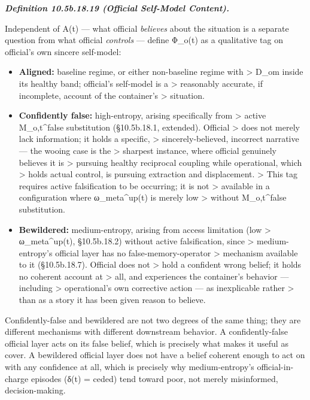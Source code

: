 \documentclass[
]{article}
\begin{document}
\emph{\textbf{Definition 10.5b.18.19 (Official Self-Model Content).}}

Independent of A(t) --- what official \emph{believes} about the
situation is a separate question from what official \emph{controls} ---
define Φ\_o(t) as a qualitative tag on official's own sincere
self-model:

\begin{itemize}
\item
  \textbf{Aligned:} baseline regime, or either non-baseline regime with
  \textgreater{} D\_om inside its healthy band; official's self-model is
  a \textgreater{} reasonably accurate, if incomplete, account of the
  container's \textgreater{} situation.
\item
  \textbf{Confidently false:} high-entropy, arising specifically from
  \textgreater{} active M\_o,t\^{}false substitution (§10.5b.18.1,
  extended). Official \textgreater{} does not merely lack information;
  it holds a specific, \textgreater{} sincerely-believed, incorrect
  narrative --- the wooing case is the \textgreater{} sharpest instance,
  where official genuinely believes it is \textgreater{} pursuing
  healthy reciprocal coupling while operational, which \textgreater{}
  holds actual control, is pursuing extraction and displacement.
  \textgreater{} This tag requires active falsification to be occurring;
  it is not \textgreater{} available in a configuration where
  ω\_meta\^{}up(t) is merely low \textgreater{} without M\_o,t\^{}false
  substitution.
\item
  \textbf{Bewildered:} medium-entropy, arising from access limitation
  (low \textgreater{} ω\_meta\^{}up(t), §10.5b.18.2) without active
  falsification, since \textgreater{} medium-entropy's official layer
  has no false-memory-operator \textgreater{} mechanism available to it
  (§10.5b.18.7). Official does not \textgreater{} hold a confident wrong
  belief; it holds no coherent account at \textgreater{} all, and
  experiences the container's behavior --- including \textgreater{}
  operational's own corrective action --- as inexplicable rather
  \textgreater{} than as a story it has been given reason to believe.
\end{itemize}

Confidently-false and bewildered are not two degrees of the same thing;
they are different mechanisms with different downstream behavior. A
confidently-false official layer acts on its false belief, which is
precisely what makes it useful as cover. A bewildered official layer
does not have a belief coherent enough to act on with any confidence at
all, which is precisely why medium-entropy's official-in-charge episodes
(δ(t) = ceded) tend toward poor, not merely misinformed,
decision-making.
\end{document}
